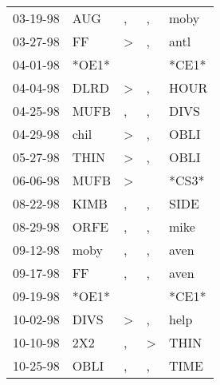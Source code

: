 \begin{supertabular}{p{0.07\textwidth}p{0.06\textwidth}p{0.02\textwidth}p{0.02\textwidth}p{0.06\textwidth}}
 03-19-98\textsuperscript{} &   AUG\textsuperscript{} &             , &             , &  moby\textsuperscript{} \\
 03-27-98\textsuperscript{} &    FF\textsuperscript{} &  \textgreater &             , &  antl\textsuperscript{} \\
 04-01-98\textsuperscript{} &                   *OE1* &               &               &                   *CE1* \\
 04-04-98\textsuperscript{} &  DLRD\textsuperscript{} &  \textgreater &             , &  HOUR\textsuperscript{} \\
 04-25-98\textsuperscript{} &  MUFB\textsuperscript{} &             , &             , &  DIVS\textsuperscript{} \\
 04-29-98\textsuperscript{} &  chil\textsuperscript{} &  \textgreater &             , &  OBLI\textsuperscript{} \\
 05-27-98\textsuperscript{} &  THIN\textsuperscript{} &  \textgreater &             , &  OBLI\textsuperscript{} \\
 06-06-98\textsuperscript{} &  MUFB\textsuperscript{} &  \textgreater &               &                   *CS3* \\
 08-22-98\textsuperscript{} &  KIMB\textsuperscript{} &             , &             , &  SIDE\textsuperscript{} \\
 08-29-98\textsuperscript{} &  ORFE\textsuperscript{} &             , &             , &  mike\textsuperscript{} \\
 09-12-98\textsuperscript{} &  moby\textsuperscript{} &             , &             , &  aven\textsuperscript{} \\
 09-17-98\textsuperscript{} &    FF\textsuperscript{} &             , &             , &  aven\textsuperscript{} \\
 09-19-98\textsuperscript{} &                   *OE1* &               &               &                   *CE1* \\
 10-02-98\textsuperscript{} &  DIVS\textsuperscript{} &  \textgreater &             , &  help\textsuperscript{} \\
 10-10-98\textsuperscript{} &   2X2\textsuperscript{} &             , &  \textgreater &  THIN\textsuperscript{} \\
 10-25-98\textsuperscript{} &  OBLI\textsuperscript{} &             , &             , &  TIME\textsuperscript{} \\

\end{supertabular}
